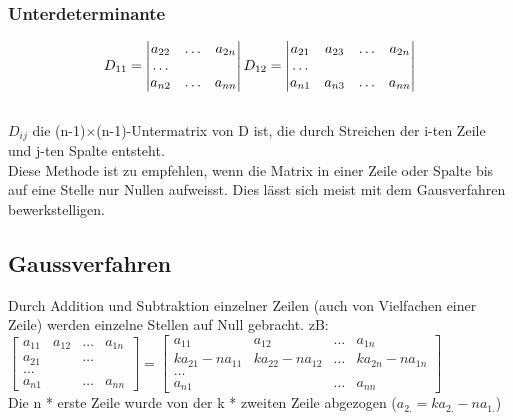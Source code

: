 	\subsubsection{Unterdeterminante}
	$$D_{11}=
	\begin{vmatrix}
    	a_{22} & \ldots & a_{2n}\\
    	\ldots\\
    	a_{n2}& \ldots & a_{nn}
    \end{vmatrix} 	\\
	D_{12}=
	\begin{vmatrix}
    	a_{21} & a_{23}& \ldots & a_{2n}\\
    	\ldots\\
    	a_{n1}& a_{n3}&\ldots & a_{nn}
    \end{vmatrix}$$\\
	$D_{ij}$ die (n-1)$ \times $(n-1)-Untermatrix von D ist, die durch Streichen der
	i-ten Zeile und j-ten Spalte entsteht.\\
	Diese Methode ist zu empfehlen, wenn die Matrix in einer Zeile oder Spalte
	bis auf eine Stelle nur Nullen aufweisst.
	Dies lässt sich meist mit dem Gausverfahren bewerkstelligen.
	
\subsection{Gaussverfahren}
	Durch Addition und Subtraktion einzelner Zeilen (auch von Vielfachen einer
	Zeile) werden einzelne Stellen auf Null gebracht. zB:\\
	$\begin{bmatrix}
    	a_{11} & a_{12}& \ldots & a_{1n}\\
    	a_{21}& &\ldots & \\
    	\ldots \\
    	a_{n1} & & \ldots & a_{nn}    			
    \end{bmatrix}=
	\begin{bmatrix}
    	a_{11} & a_{12}& \ldots & a_{1n}\\
    	k a_{21}-n a_{11}& ka_{22}-n a_{12}&\ldots & k a_{2n} - n a_{1n}\\
    	\ldots \\
    	a_{n1} & & \ldots & a_{nn}    			
    \end{bmatrix}$ \\
	Die n * erste Zeile wurde von der k * zweiten Zeile abgezogen ($a_{2.}= 
	k a_{2.}- n a_{1.}$)
	
